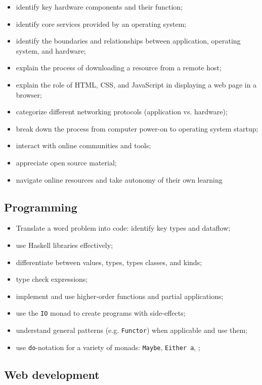 \documentclass[11pt]{article}
\newcommand{\code}{\texttt}
\begin{document}
\begin{itemize}
  \item identify key hardware components and their function;
  \item identify core services provided by an operating system;
  \item identify the boundaries and relationships between application,
    operating system, and hardware;
  \item explain the process of downloading a resource from a remote host;
  \item explain the role of HTML, CSS, and JavaScript in displaying a web page
    in a browser;
  \item categorize different networking protocols (application vs. hardware);
  \item break down the process from computer power-on to operating system
    startup;
  \item interact with online communities and tools;
  \item appreciate open source material;
  \item navigate online resources and take autonomy of their own learning
\end{itemize}

\subsection*{Programming}

\begin{itemize}
  \item Translate a word problem into code: identify key types and dataflow;
  \item use Haskell libraries effectively;
  \item differentiate between values, types, types classes, and kinds;
  \item type check expressions;
  \item implement and use higher-order functions and partial applications;
  \item use the \code{IO} monad to create programs with side-effects;
  \item understand general patterns (e.g. \code{Functor}) when applicable and
    use them;
  \item
    use \code{do}-notation for a variety of monads:
    \code{Maybe}, \code{Either a}, \textellipsis;
\end{itemize}

\subsection*{Web development}
\end{document}
